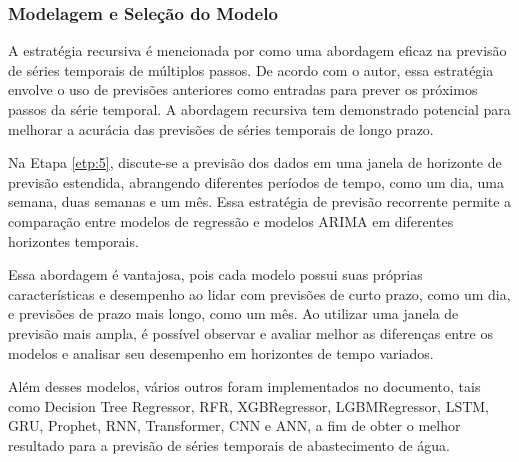 \subsubsection{Modelagem e Sele\c c\~ao do Modelo}\label{subsubsec:est}

A estratégia recursiva é mencionada por  como uma abordagem eficaz na previsão de séries temporais de múltiplos passos. De acordo com o autor, essa estratégia envolve o uso de previsões anteriores como entradas para prever os próximos passos da série temporal. A abordagem recursiva tem demonstrado potencial para melhorar a acurácia das previsões de séries temporais de longo prazo.

Na Etapa \ref{etp:5}, discute-se a previsão dos dados em uma janela de horizonte de previsão estendida, abrangendo diferentes períodos de tempo, como um dia, uma semana, duas semanas e um mês. Essa estratégia de previsão recorrente permite a comparação entre modelos de regressão e modelos ARIMA em diferentes horizontes temporais.

Essa abordagem é vantajosa, pois cada modelo possui suas próprias características e desempenho ao lidar com previsões de curto prazo, como um dia, e previsões de prazo mais longo, como um mês. Ao utilizar uma janela de previsão mais ampla, é possível observar e avaliar melhor as diferenças entre os modelos e analisar seu desempenho em horizontes de tempo variados.

Além desses modelos, vários outros foram implementados no documento, tais como Decision Tree Regressor, RFR, XGBRegressor, LGBMRegressor, LSTM, GRU, Prophet, RNN, Transformer, CNN e ANN, a fim de obter o melhor resultado para a previsão de séries temporais de abastecimento de água.